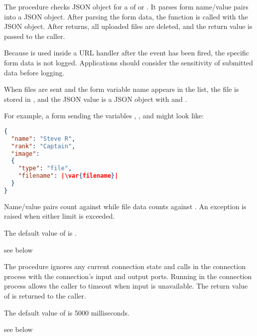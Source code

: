 The  procedure checks JSON object
 for a  of 
or . It parses form name/value
pairs into a JSON object.  After parsing the form data, the function
 is called with the JSON object. After  returns, all
uploaded files are deleted, and the return value is passed to the
caller.

Because  is used inside a URL handler after
the  event has been fired, the specific form data
is not logged. Applications should consider the sensitivity of
submitted data before logging.

When files are sent and the form variable name appears in the
 list, the file is stored in , and the JSON
value is a JSON object with  and
.

For example, a form sending the variables , ,
and  might look like:

\begin{lstlisting}[language=json,frame=none]
{
  "name": "Steve R",
  "rank": "Captain",
  "image":
  {
    "type": "file",
    "filename": |\var{filename}|
  }
}
\end{lstlisting}

Name/value pairs count against  while file data
counts against . An exception is raised when either
limit is exceeded.

The default value of  is .

\begin{procedure}
\end{procedure}
\returns {} see below

The  procedure ignores any current
connection state and calls  in the connection process with the
connection's input and output ports.  Running  in the
connection process allows the caller to timeout when input is
unavailable. The return value of  is returned to the caller.

The default value of  is 5000 milliseconds.

\begin{procedure}
\end{procedure}
\returns {} see below

